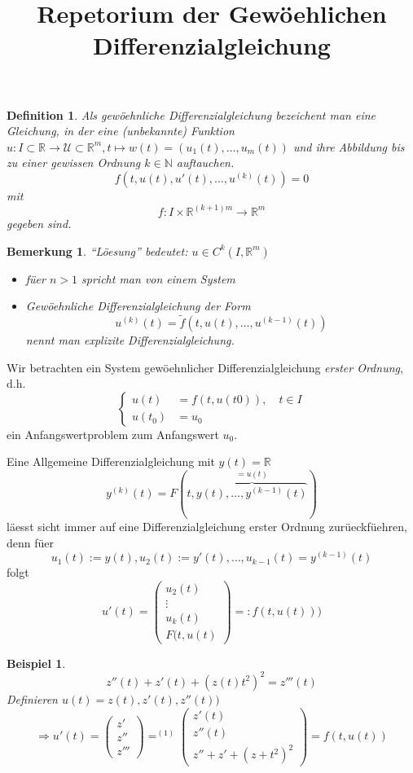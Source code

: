 \documentclass[11pt]{article}
\title{Repetorium der Gew\"oehlichen Differenzialgleichung}
\newcommand{\RR}{\mathbb{R}}
\newcommand{\NN}{\mathbb{N}}
\newcommand{\UU}{\mathcal{U}}
\newcounter{myCounter}[section]
\newtheorem{Def}[myCounter]{Definition}
\newtheorem{Bem}[myCounter]{Bemerkung}
\newtheorem{Bsp}[myCounter]{Beispiel}
\begin{document}
\maketitle

\begin{Def}
  Als gew\"oehnliche Differenzialgleichung bezeichent man eine Gleichung, in der eine (unbekannte)
  Funktion $u: I \subset \RR \rightarrow \UU \subset \RR^m , t \mapsto w(t)=
  (u_1(t), \dotsc, u_m(t))$ und ihre Abbildung bis zu einer gewissen Ordnung $
  k \in \NN$ auftauchen. \[
    f(t,u(t), u'(t), \dotsc, u^{(k)}(t)) = 0 \]
  mit \[
    f:I \times \RR^{(k+1)m} \rightarrow \RR^m \]
  gegeben sind.
\end{Def}

\begin{Bem}
  ``L\"oesung'' bedeutet: $u\in C^k(I,\RR^m)$
  \begin{itemize}
  \item f\"uer $n > 1$ spricht man von einem System
  \item Gew\"oehnliche Differenzialgleichung der Form \[
    u^{(k)}(t) = \tilde{f}(t,u(t),\dotsc,u^{(k-1)}(t)) \]
    nennt man \emph{explizite} Differenzialgleichung.
  \end{itemize}
\end{Bem}
Wir betrachten ein System gew\"oehnlicher Differenzialgleichung \emph{erster Ordnung}, d.h.\[
  \left\{\begin{aligned} u(t) &= f(t,u(t0)), \quad t \in I \\ u(t_0) &= u_0
  \end{aligned} \right. \]
ein Anfangswertproblem zum Anfangswert $u_0$.

Eine Allgemeine Differenzialgleichung mit $y(t) = \RR$ \[
  y^{(k)}(t) = F(t,\overbrace{y(t),\dotsc,y^{(k-1)}(t)}^{=u(t)}) \]
l\"aesst sicht immer auf eine Differenzialgleichung erster Ordnung zur\"ueckf\"uehren, denn f\"uer
\[ u_1(t):=y(t), u_2(t) := y'(t), \dotsc, u_{k-1}(t)=y^{(k-1)}(t) \] folgt \[
  u'(t) = \begin{pmatrix} u_2(t) \\ \vdots \\ u_k(t) \\ F(t,u(t) \end{pmatrix} =
: f(t,u(t))) \]

\begin{Bsp}
\[ z''(t) + z'(t) + (z(t)t^2)^2 = z'''(t) \tag{1} \]
Definieren $u(t) = z(t), z'(t), z''(t) )$ \[
  \Rightarrow u'(t) = \begin{pmatrix} z' \\ z'' \\ z''' \end{pmatrix}  
  \mathop{=}^{(1)} \begin{pmatrix} z'(t) \\ z''(t) \\ z'' + z' + (z + t^2)^2
  \end{pmatrix} = f(t,u(t)) \]
\end{Bsp}
\end{document}
